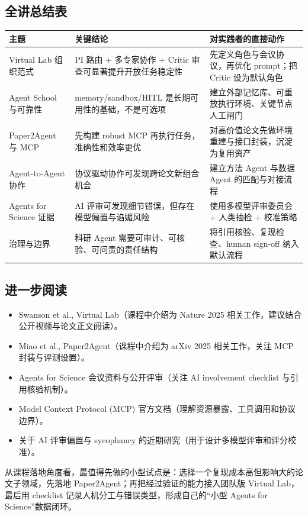 \documentclass[a4paper]{article}
\begin{document}
\subsection*{全讲总结表}

\begin{table}[H]
\centering
\small
\begin{tabular}{p{}p{}p{}}
\toprule
主题 & 关键结论 & 对实践者的直接动作 \\
\midrule
Virtual Lab 组织范式 & PI 路由 + 多专家协作 + Critic 审查可显著提升开放任务稳定性 & 先定义角色与会议协议，再优化 prompt；把 Critic 设为默认角色 \\
Agent School 与可靠性 & memory/sandbox/HITL 是长期可用性的基础，不是可选项 & 建立外部记忆库、可重放执行环境、关键节点人工闸门 \\
Paper2Agent 与 MCP & 先构建 robust MCP 再执行任务，准确性和效率更优 & 对高价值论文先做环境重建与接口封装，沉淀为复用资产 \\
Agent-to-Agent 协作 & 协议驱动协作可发现跨论文新组合机会 & 建立方法 Agent 与数据 Agent 的匹配与对接流程 \\
Agents for Science 证据 & AI 评审可发现细节错误，但存在模型偏置与谄媚风险 & 使用多模型评审委员会 + 人类抽检 + 校准策略 \\
治理与边界 & 科研 Agent 需要可审计、可核验、可问责的责任结构 & 将引用核验、复现检查、human sign-off 纳入默认流程 \\
\bottomrule
\end{tabular}
\end{table}

\subsection*{进一步阅读}

\begin{itemize}
    \item Swanson et al., Virtual Lab（课程中介绍为 Nature 2025 相关工作，建议结合公开视频与论文正文阅读）。
    \item Miao et al., Paper2Agent（课程中介绍为 arXiv 2025 相关工作，关注 MCP 封装与评测设置）。
    \item Agents for Science 会议资料与公开评审（关注 AI involvement checklist 与引用核验机制）。
    \item Model Context Protocol (MCP) 官方文档（理解资源暴露、工具调用和协议边界）。
    \item 关于 AI 评审偏置与 sycophancy 的近期研究（用于设计多模型评审和评分校准）。
\end{itemize}

从课程落地角度看，最值得先做的小型试点是：选择一个复现成本高但影响大的论文子领域，先落地 Paper2Agent；再把经过验证的能力接入团队版 Virtual Lab，最后用 checklist 记录人机分工与错误类型，形成自己的``小型 Agents for Science''数据闭环。
\end{document}
